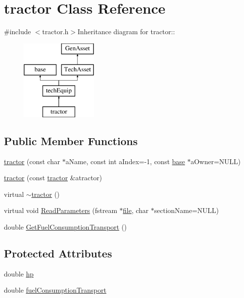\hypertarget{classtractor}{
\section{tractor Class Reference}
\label{classtractor}
}


{\ttfamily \#include $<$tractor.h$>$}Inheritance diagram for tractor::\begin{figure}[H]
\begin{center}
\leavevmode
\includegraphics[height=4cm]{classtractor}
\end{center}
\end{figure}
\subsection*{Public Member Functions}
\begin{DoxyCompactItemize}
\item 
\hyperlink{classtractor_aa930d6242e8c2d21d3c1f418d1a61547}{tractor} (const char $\ast$aName, const int aIndex=-\/1, const \hyperlink{classbase}{base} $\ast$aOwner=NULL)
\item 
\hyperlink{classtractor_a9eaef30f5127f77654bb0ac181353b8c}{tractor} (const \hyperlink{classtractor}{tractor} \&atractor)
\item 
virtual \hyperlink{classtractor_a6e8c0530e0bf6ae8bf14aa2ab9f1a9ad}{$\sim$tractor} ()
\item 
virtual void \hyperlink{classtractor_aeb535e7ae93c012609c660369ed23f3c}{ReadParameters} (fstream $\ast$\hyperlink{classbase_a3af52ee9891719d09b8b19b42450b6f6}{file}, char $\ast$sectionName=NULL)
\item 
double \hyperlink{classtractor_a6dc78ca234cc9f33199ad9560a587ef7}{GetFuelConsumptionTransport} ()
\end{DoxyCompactItemize}
\subsection*{Protected Attributes}
\begin{DoxyCompactItemize}
\item 
double \hyperlink{classtractor_a2b9a49491b1db7c4a7919eba64f319cd}{hp}
\item 
double \hyperlink{classtractor_ab85c7fb537aeb6af66eedaa19ce5bd76}{fuelConsumptionTransport}
\end{DoxyCompactItemize}


